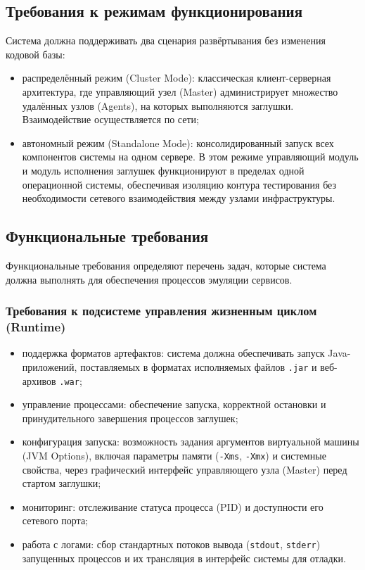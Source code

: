 \subsection{Требования к режимам функционирования}

Система должна поддерживать два сценария развёртывания без изменения кодовой базы:

\begin{itemize}
\item распределённый режим (Cluster Mode): классическая клиент-серверная архитектура, где управляющий узел (Master) администрирует множество удалённых узлов (Agents), на которых выполняются заглушки. Взаимодействие осуществляется по сети;
\item автономный режим (Standalone Mode): консолидированный запуск всех компонентов системы на одном сервере. В этом режиме управляющий модуль и модуль исполнения заглушек функционируют в пределах одной операционной системы, обеспечивая изоляцию контура тестирования без необходимости сетевого взаимодействия между узлами инфраструктуры.
\end{itemize}

\subsection{Функциональные требования}

Функциональные требования определяют перечень задач, которые система должна выполнять для обеспечения процессов эмуляции сервисов.

\subsubsection {Требования к подсистеме управления жизненным циклом (Runtime)}

\begin{itemize}
\item поддержка форматов артефактов: система должна обеспечивать запуск Java-приложений, поставляемых в форматах исполняемых файлов \texttt{.jar} и веб-архивов \texttt{.war};
\item управление процессами: обеспечение запуска, корректной остановки и принудительного завершения процессов заглушек;
\item конфигурация запуска: возможность задания аргументов виртуальной машины (JVM Options), включая параметры памяти (\texttt{-Xms}, \texttt{-Xmx}) и системные свойства, через графический интерфейс управляющего узла (Master) перед стартом заглушки;
\item мониторинг: отслеживание статуса процесса (PID) и доступности его сетевого порта;
\item работа с логами: сбор стандартных потоков вывода (\texttt{stdout}, \texttt{stderr}) запущенных процессов и их трансляция в интерфейс системы для отладки.
\end{itemize}

